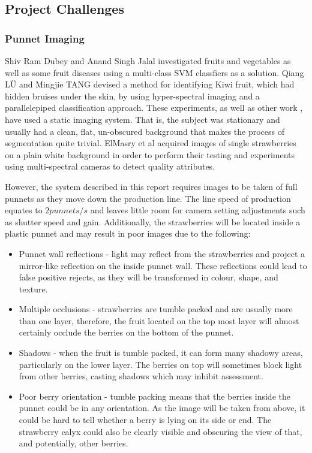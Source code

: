 \documentclass[fleqn,twoside]{article}
\begin{document}
\subsection{Project Challenges}
\label{sec:challenges}

\subsubsection{Punnet Imaging}

Shiv Ram Dubey and Anand Singh Jalal \cite{shiv} investigated fruits and vegetables as well as some fruit diseases using a multi-class SVM classfiers as a solution. Qiang LÜ and Mingjie TANG \cite{lu} devised a method for identifying Kiwi fruit, which had hidden bruises under the skin, by using hyper-spectral imaging and a parallelepiped classification approach. These experiments, as well as other work \cite{elmasry2,chiu}, have used a static imaging system. That is, the subject was stationary and usually had a clean, flat, un-obscured background that makes the process of segmentation quite trivial. ElMasry et al \cite{elmasry2} acquired images of single strawberries on a plain white background in order to perform their testing and experiments using multi-spectral cameras to detect quality attributes. 

However, the system described in this report requires images to be taken of full punnets as they move down the production line. The line speed of production equates to $2 punnets/s$ and leaves little room for camera setting adjustments such as shutter speed and gain. Additionally, the strawberries will be located inside a plastic punnet and may result in poor images due to the following:  

\begin{itemize}
	\item Punnet wall reflections - light may reflect from the strawberries and project a mirror-like reflection on the inside punnet wall. These reflections could lead to false positive rejects, as they will be transformed in colour, shape, and texture.
	\item Multiple occlusions - strawberries are tumble packed and are usually more than one layer, therefore, the fruit located on the top most layer will almost certainly occlude the berries on the bottom of the punnet. 
	\item Shadows - when the fruit is tumble packed, it can form many shadowy areas, particularly on the lower layer. The berries on top will sometimes block light from other berries, casting shadows which may inhibit assessment.
	\item Poor berry orientation - tumble packing means that the berries inside the punnet could be in any orientation. As the image will be taken from above, it could be hard to tell whether a berry is lying on its side or end. The strawberry calyx could also be clearly visible and obscuring the view of that, and potentially, other berries. 
\end{itemize}
\end{document}
